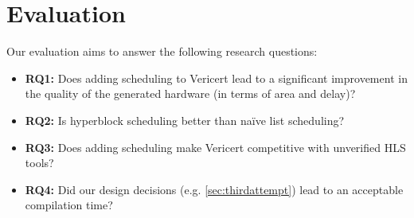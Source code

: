 {%

\section{Evaluation}
\label{sec:performance-comparison}

Our evaluation aims to answer the following research questions:

\begin{itemize}

\item {\textbf{RQ1:}} Does adding scheduling to Vericert lead to a significant improvement in the quality of the generated hardware (in terms of area and delay)?

\item {\textbf{RQ2:}} Is hyperblock scheduling better than na\"ive list scheduling?

\item {\textbf{RQ3:}} Does adding scheduling make Vericert competitive with unverified HLS tools?

\item {\textbf{RQ4:}} Did our design decisions (e.g. \cref{sec:thirdattempt}) lead to an acceptable compilation time?

\end{itemize}



}

